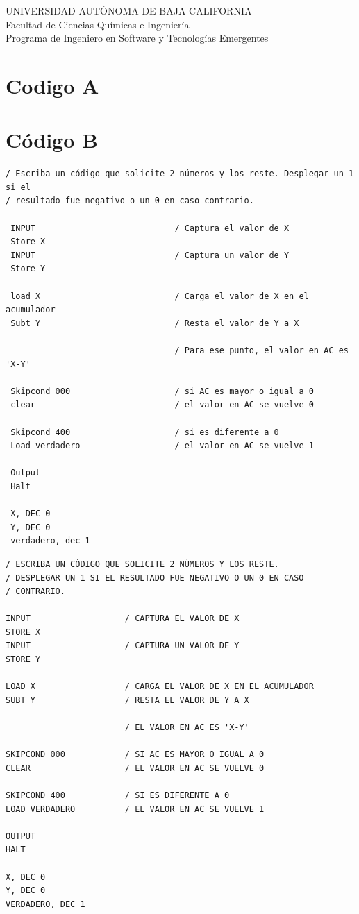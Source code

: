 \documentclass[12pt]{article}
\begin{document}
\thispagestyle{empty}
\begin{center}
	{\large
		UNIVERSIDAD AUTÓNOMA DE BAJA CALIFORNIA \\
		Facultad de Ciencias Químicas e Ingeniería }
	\vspace{0.25in} \\
	Programa de Ingeniero en Software y Tecnologías Emergentes
\end{center}

\section{Codigo A}
\label{sec:org8543722}
\lipsum[1-1]

\section{Código B}
\label{sec:orgfa1a854}



\begin{lstlisting}
/ Escriba un código que solicite 2 números y los reste. Desplegar un 1 si el
/ resultado fue negativo o un 0 en caso contrario.  

 INPUT                            / Captura el valor de X
 Store X                          
 INPUT                            / Captura un valor de Y
 Store Y                          
 
 load X                           / Carga el valor de X en el acumulador
 Subt Y                           / Resta el valor de Y a X 
 
                                  / Para ese punto, el valor en AC es 'X-Y'
 
 Skipcond 000                     / si AC es mayor o igual a 0 
 clear                            / el valor en AC se vuelve 0
 
 Skipcond 400                     / si es diferente a 0
 Load verdadero                   / el valor en AC se vuelve 1
 
 Output
 Halt
 
 X, DEC 0
 Y, DEC 0
 verdadero, dec 1
\end{lstlisting}

\begin{lstlisting}
/ ESCRIBA UN CÓDIGO QUE SOLICITE 2 NÚMEROS Y LOS RESTE. 
/ DESPLEGAR UN 1 SI EL RESULTADO FUE NEGATIVO O UN 0 EN CASO 
/ CONTRARIO.  

INPUT                   / CAPTURA EL VALOR DE X
STORE X                          
INPUT                   / CAPTURA UN VALOR DE Y
STORE Y                          

LOAD X                  / CARGA EL VALOR DE X EN EL ACUMULADOR
SUBT Y                  / RESTA EL VALOR DE Y A X 

                        / EL VALOR EN AC ES 'X-Y'

SKIPCOND 000            / SI AC ES MAYOR O IGUAL A 0 
CLEAR                   / EL VALOR EN AC SE VUELVE 0

SKIPCOND 400            / SI ES DIFERENTE A 0
LOAD VERDADERO          / EL VALOR EN AC SE VUELVE 1

OUTPUT
HALT

X, DEC 0
Y, DEC 0
VERDADERO, DEC 1
\end{lstlisting}
\end{document}
